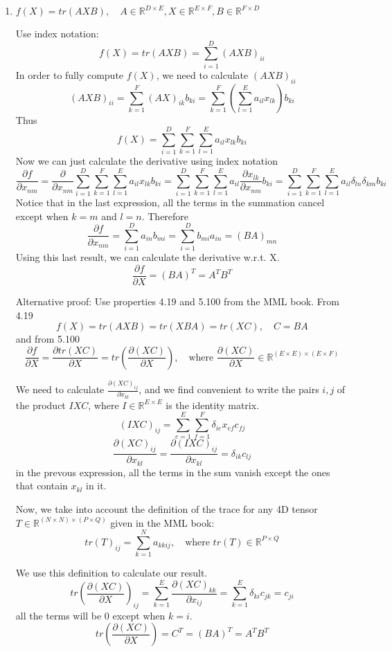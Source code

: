 \begin{enumerate}[label=\alph*]
\item $f(X) = tr(AXB), \quad A\in \mathbb{R}^{D\times E},
X\in \mathbb{R}^{E\times F},
B\in \mathbb{R}^{F\times D}$

Use index notation:
\[
f(X) = tr(AXB) = \sum_{i=1}^D (AXB)_{ii}
\]
In order to fully compute $f(X)$, we need to calculate $(AXB)_{ii}$
\[
(AXB)_{ii} = \sum_{k=1}^F (AX)_{ik}b_{ki} = \sum_{k=1}^F \left(\sum_{l=1}^E a_{il}x_{lk}\right)b_{ki}
\]
Thus
\[
f(X) = \sum_{i=1}^D\sum_{k=1}^F \sum_{l=1}^E a_{il}x_{lk}b_{ki}
\]
Now we can just calculate the derivative using index notation
\[
\frac{\partial f}{\partial x_{nm}} = \frac{\partial}{\partial x_{nm}} \sum_{i=1}^D\sum_{k=1}^F \sum_{l=1}^E a_{il}x_{lk}b_{ki} = \sum_{i=1}^D\sum_{k=1}^F \sum_{l=1}^E a_{il}\frac{\partial x_{lk}}{\partial x_{nm}}b_{ki} = \sum_{i=1}^D\sum_{k=1}^F \sum_{l=1}^E a_{il}\delta_{ln}\delta_{km}b_{ki}
\]
Notice that in the last expression, all the terms in the summation cancel except when $k=m$ and $l=n$. Therefore
\[
\frac{\partial f}{\partial x_{nm}} = \sum_{i=1}^D a_{in}b_{mi} = \sum_{i=1}^D b_{mi}a_{in} = (BA)_{mn}
\]
Using this last result, we can calculate the derivative w.r.t. X.
\[
\frac{\partial f}{\partial X} = (BA)^T = A^TB^T
\]

Alternative proof: Use properties 4.19 and 5.100 from the MML book.
From 4.19
\[
f(X) = tr(AXB) = tr(XBA) = tr(XC), \quad C = BA
\]
and from 5.100
\[
\frac{\partial f}{\partial X} = \frac{\partial tr(XC)}{\partial X} = tr\left(\frac{\partial (XC)}{\partial X}\right), \quad \text{where } \frac{\partial (XC)}{\partial X}\in \mathbb{R}^{(E \times E) \times (E \times F)}
\]

We need to calculate $\frac{\partial (XC)_{ij}}{\partial x_{kl}}$, and we find convenient to write the pairs $i,j$ of the product $IXC$, where $I \in \mathbb{R}^{E\times E}$ is the identity matrix.
\[
(IXC)_{ij} = \sum_{e=1}^E \sum_{f=1}^F \delta_{ie}x_{ef}c_{fj}
\]
\[
\frac{\partial (XC)_{ij}}{\partial x_{kl}} = \frac{\partial (IXC)_{ij}}{\partial x_{kl}} = \delta_{ik}c_{lj}
\]
in the prevous expression, all the terms in the sum vanish except the ones that contain $x_{kl}$ in it.

Now, we take into account the definition of the trace for any 4D tensor $T\in\mathbb{R}^{(N\times N)\times (P \times Q)}$ given in the MML book:
\[
tr(T)_{ij} = \sum_{k=1}^N a_{kkij}, \quad \text{where } tr(T) \in \mathbb{R}^{P\times Q}
\]

We use this definition to calculate our result.
\[
tr\left(\frac{\partial (XC)}{\partial X}\right)_{ij} = \sum_{k=1}^{E} \frac{\partial (XC)_{kk}}{\partial x_{ij}} = \sum_{k=1}^{E} \delta_{ki} c_{jk} = c_{ji}
\]
all the terms will be 0 except when $k=i$.
\[
tr\left(\frac{\partial (XC)}{\partial X}\right) = C^T = (BA)^T = A^TB^T
\]
\end{enumerate}



